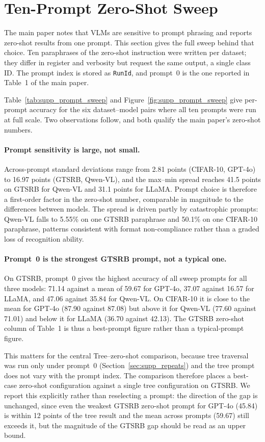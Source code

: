 \documentclass[10pt,twocolumn,letterpaper]{article}
\begin{document}
\section{Ten-Prompt Zero-Shot Sweep}
\label{sec:supp_prompts}

The main paper notes that VLMs are sensitive to prompt phrasing and reports
zero-shot results from one prompt. This section gives the full sweep behind
that choice. Ten paraphrases of the zero-shot instruction were written per
dataset; they differ in register and verbosity but request the same output, a
single class ID. The prompt index is stored as \texttt{RunId}, and prompt~0 is
the one reported in Table~1 of the main paper.

Table~\ref{tab:supp_prompt_sweep} and Figure~\ref{fig:supp_prompt_sweep} give
per-prompt accuracy for the six dataset--model pairs where all ten prompts were
run at full scale. Two observations follow, and both qualify the main paper's
zero-shot numbers.

\paragraph{Prompt sensitivity is large, not small.} Across-prompt standard
deviations range from 2.81 points (CIFAR-10, GPT-4o) to 16.97 points (GTSRB,
Qwen-VL), and the max--min spread reaches 41.5 points on GTSRB for Qwen-VL and
31.1 points for LLaMA. Prompt choice is therefore a first-order factor in the
zero-shot number, comparable in magnitude to the differences between models.
The spread is driven partly by catastrophic prompts: Qwen-VL falls to 5.55\% on
one GTSRB paraphrase and 50.1\% on one CIFAR-10 paraphrase, patterns consistent
with format non-compliance rather than a graded loss of recognition ability.

\paragraph{Prompt~0 is the strongest GTSRB prompt, not a typical one.} On
GTSRB, prompt~0 gives the highest accuracy of all sweep prompts for all three
models: 71.14 against a mean of 59.67 for GPT-4o, 37.07 against 16.57 for
LLaMA, and 47.06 against 35.84 for Qwen-VL. On CIFAR-10 it is close to the mean
for GPT-4o (87.90 against 87.08) but above it for Qwen-VL (77.60 against 71.01)
and below it for LLaMA (36.70 against 42.13). The GTSRB zero-shot column of
Table~1 is thus a best-prompt figure rather than a typical-prompt figure.

This matters for the central Tree--zero-shot comparison, because tree traversal
was run only under prompt~0 (Section~\ref{sec:supp_repeats}) and the tree
prompt does not vary with the prompt index. The comparison therefore places a
best-case zero-shot configuration against a single tree configuration on GTSRB.
We report this explicitly rather than reselecting a prompt: the direction of
the gap is unchanged, since even the weakest GTSRB zero-shot prompt for GPT-4o
(45.84) is within 12 points of the tree result and the mean across prompts
(59.67) still exceeds it, but the magnitude of the GTSRB gap should be read as
an upper bound.
\end{document}
